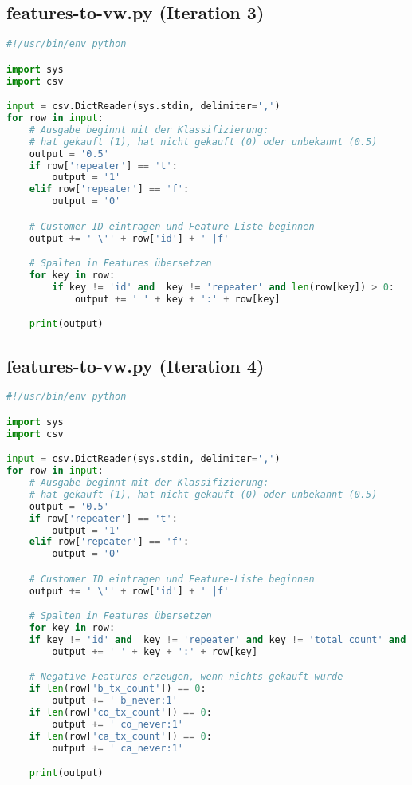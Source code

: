 \subsection{features-to-vw.py (Iteration 3)}
\label{code:features-to-vw}
\begin{lstlisting}[language=Python]
#!/usr/bin/env python

import sys
import csv

input = csv.DictReader(sys.stdin, delimiter=',')
for row in input:
	# Ausgabe beginnt mit der Klassifizierung:
	# hat gekauft (1), hat nicht gekauft (0) oder unbekannt (0.5)
	output = '0.5'
	if row['repeater'] == 't':
		output = '1'
	elif row['repeater'] == 'f':
		output = '0'

	# Customer ID eintragen und Feature-Liste beginnen
	output += ' \'' + row['id'] + ' |f'

	# Spalten in Features übersetzen
	for key in row:
		if key != 'id' and  key != 'repeater' and len(row[key]) > 0:
			output += ' ' + key + ':' + row[key]

	print(output)
\end{lstlisting}

\subsection{features-to-vw.py (Iteration 4)}
\label{code:features-to-vw-4}
\begin{lstlisting}[language=Python]
#!/usr/bin/env python

import sys
import csv

input = csv.DictReader(sys.stdin, delimiter=',')
for row in input:
    # Ausgabe beginnt mit der Klassifizierung:
    # hat gekauft (1), hat nicht gekauft (0) oder unbekannt (0.5)
    output = '0.5'
    if row['repeater'] == 't':
        output = '1'
    elif row['repeater'] == 'f':
        output = '0'

    # Customer ID eintragen und Feature-Liste beginnen
    output += ' \'' + row['id'] + ' |f'

    # Spalten in Features übersetzen
    for key in row:
    if key != 'id' and  key != 'repeater' and key != 'total_count' and key != 'total_spent' and len(row[key]) > 0:
        output += ' ' + key + ':' + row[key]

    # Negative Features erzeugen, wenn nichts gekauft wurde
    if len(row['b_tx_count']) == 0:
        output += ' b_never:1'
    if len(row['co_tx_count']) == 0:
        output += ' co_never:1'
    if len(row['ca_tx_count']) == 0:
        output += ' ca_never:1'

    print(output)
\end{lstlisting}


